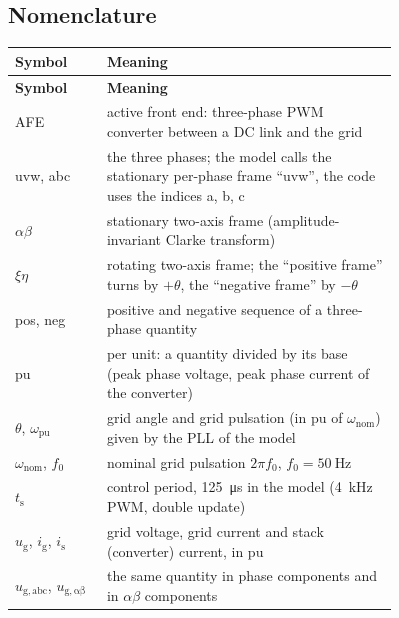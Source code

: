 \documentclass[11pt,a4paper]{scrartcl}
\newcommand{\ped}[1]{_{\mathrm{#1}}}
\begin{document}


\tableofcontents
\listoffigures
\listoftables
\newpage

\begin{onehalfspace}

\section*{Nomenclature}
\label{sec:nomenclature}

\begingroup
{}
\begin{longtable}{@{} l p{0.76\linewidth} @{}}
	\toprule
	\textbf{Symbol} & \textbf{Meaning} \\
	\midrule
	\endfirsthead
	\toprule
	\textbf{Symbol} & \textbf{Meaning} \\
	\midrule
	\endhead
	\bottomrule
	\endfoot
	\bottomrule
	\endlastfoot
	AFE & active front end: three-phase PWM converter between a DC link and the grid \\
	uvw, abc & the three phases; the model calls the stationary per-phase frame ``uvw'', the code uses the indices a, b, c \\
	$\alpha\beta$ & stationary two-axis frame (amplitude-invariant Clarke transform) \\
	$\xi\eta$ & rotating two-axis frame; the ``positive frame'' turns by $+\theta$, the ``negative frame'' by $-\theta$ \\
	pos, neg & positive and negative sequence of a three-phase quantity \\
	pu & per unit: a quantity divided by its base (peak phase voltage, peak phase current of the converter) \\
	$\theta$, $\omega\ped{pu}$ & grid angle and grid pulsation (in pu of $\omega\ped{nom}$) given by the PLL of the model \\
	$\omega\ped{nom}$, $f\ped{0}$ & nominal grid pulsation $2\pi f\ped{0}$, $f\ped{0} = \SI{50}{\hertz}$ \\
	$t\ped{s}$ & control period, \SI{125}{\micro\second} in the model (\SI{4}{\kilo\hertz} PWM, double update) \\
	$u\ped{g}$, $i\ped{g}$, $i\ped{s}$ & grid voltage, grid current and stack (converter) current, in pu \\
	$u\ped{g,abc}$, $u\ped{g,\alpha\beta}$ & the same quantity in phase components and in $\alpha\beta$ components \\

\end{longtable}
\end{onehalfspace}
\end{document}
